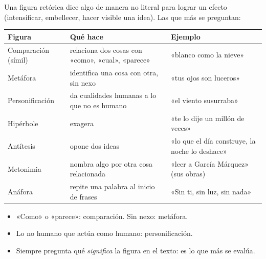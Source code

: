 

Una figura retórica dice algo de manera no literal para lograr un efecto (intensificar, embellecer, hacer visible una
idea). Las que más se preguntan:

\begin{center}\small
\begin{tabularx}{\linewidth}{@{}l>{\raggedright\arraybackslash}X>{\raggedright\arraybackslash}X@{}}
\toprule
\textbf{Figura} & \textbf{Qué hace} & \textbf{Ejemplo}\\\midrule
Comparación (símil) & relaciona dos cosas con «como», «cual», «parece» & «blanco como la nieve»\\
Metáfora & identifica una cosa con otra, sin nexo & «tus ojos son luceros»\\
Personificación & da cualidades humanas a lo que no es humano & «el viento susurraba»\\
Hipérbole & exagera & «te lo dije un millón de veces»\\
Antítesis & opone dos ideas & «lo que el día construye, la noche lo deshace»\\
Metonimia & nombra algo por otra cosa relacionada & «leer a García Márquez» (sus obras)\\
Anáfora & repite una palabra al inicio de frases & «Sin ti, sin luz, sin nada»\\\bottomrule
\end{tabularx}
\end{center}

\begin{regla}
\begin{itemize}
  \item «Como» o «parece»: comparación. Sin nexo: metáfora.
  \item Lo no humano que actúa como humano: personificación.
  \item Siempre pregunta qué \emph{significa} la figura en el texto: es lo que más se evalúa.
\end{itemize}
\end{regla}

